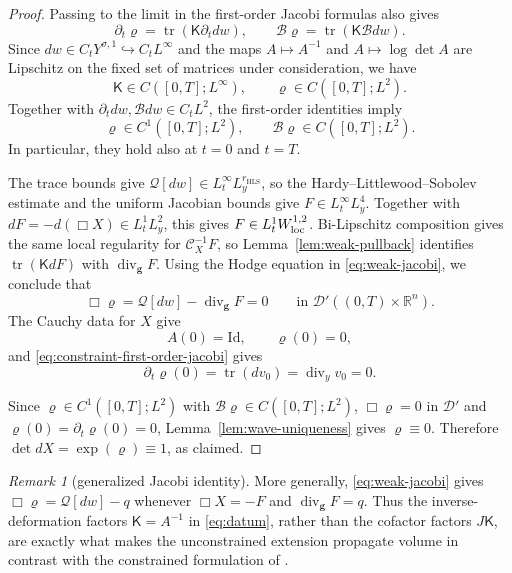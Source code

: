 \documentclass[11pt,reqno]{amsart}
\theoremstyle{plain}
\theoremstyle{definition}
\theoremstyle{remark}
\newtheorem{remark}[theorem]{Remark}
\numberwithin{equation}{section}
\DeclareMathOperator{\Div}{div}
\DeclareMathOperator{\tr}{tr}
\newcommand{\Kmat}{\mathsf K}
\newcommand{\gmetric}{\mathbf g}
\newcommand{\Real}{\mathbb R}
\newcommand{\Rn}{\Real^n}
\begin{document}
\begin{proof}
Passing to the limit in the first-order Jacobi formulas also gives
\begin{equation}\label{eq:constraint-first-order-jacobi}
 \partial_t\varrho
 =\tr(\Kmat\partial_tdw),
 \qquad
 \mathcal B\varrho
 =\tr(\Kmat\mathcal Bdw).
\end{equation}
Since $dw\in C_tY^{\sigma,1}\hookrightarrow C_tL^\infty$ and the maps
$A\mapsto A^{-1}$ and $A\mapsto\log\det A$ are Lipschitz on the fixed set of
matrices under consideration, we have
\[
 \Kmat\in C([0,T];L^\infty),
 \qquad
 \varrho\in C([0,T];L^2).
\]
Together with $\partial_tdw,\mathcal Bdw\in C_tL^2$, the first-order
identities imply
\[
 \varrho\in C^1([0,T];L^2),
 \qquad
 \mathcal B\varrho\in C([0,T];L^2).
\]
In particular, they hold also at $t=0$ and $t=T$.

The trace bounds give
$\mathcal Q[dw]\in L^\infty_tL^{r_{\mathrm{HLS}}}_y$, so the
Hardy--Littlewood--Sobolev estimate and the uniform Jacobian bounds give
$F\in L^\infty_tL^4_y$. Together with
$dF=-d(\Box X)\in L^1_tL^2_y$, this gives
$F\in L^1_tW^{1,2}_{\rm loc}$. Bi-Lipschitz composition gives the same local
regularity for $\mathcal C_X^{-1}F$, so Lemma~\ref{lem:weak-pullback}
identifies $\tr(\Kmat dF)$ with $\Div_{\gmetric}F$. Using the Hodge equation
in \eqref{eq:weak-jacobi}, we conclude that
\[
 \Box\varrho
 =\mathcal Q[dw]-\Div_{\gmetric}F
 =0
 \qquad\text{in }\mathcal D'((0,T)\times\Rn).
\]
The Cauchy data for $X$ give
\[
 A(0)=\mathrm{Id},
 \qquad
 \varrho(0)=0,
\]
and \eqref{eq:constraint-first-order-jacobi} gives
\[
 \partial_t\varrho(0)
 =\tr(dv_0)
 =\Div_yv_0
 =0.
\]

Since $\varrho\in C^1([0,T];L^2)$ with $\mathcal B\varrho\in C([0,T];L^2)$,
$\Box\varrho=0$ in $\mathcal D'$ and $\varrho(0)=\partial_t\varrho(0)=0$,
Lemma~\ref{lem:wave-uniqueness} gives $\varrho\equiv0$.
Therefore $\det dX=\exp(\varrho)\equiv1$, as claimed.
\end{proof}


\begin{remark}[generalized Jacobi identity]\label{rem:generalcaseJacobi}
More generally, \eqref{eq:weak-jacobi} gives
$\Box\varrho=\mathcal Q[dw]-q$ whenever
$\Box X=-F$ and $\Div_{\gmetric}F=q$. Thus the inverse-deformation factors
$\Kmat=A^{-1}$ in \eqref{eq:datum}, rather than the cofactor factors
$J\Kmat$, are exactly what makes the unconstrained extension propagate volume
in contrast with the constrained formulation of \cite{Zhang2024}.
\end{remark}
\end{document}
